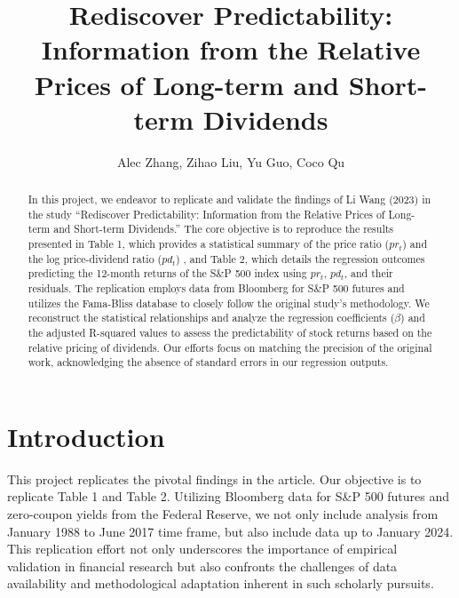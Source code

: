 \documentclass{article}
\title{Rediscover Predictability: Information from the Relative Prices of Long-term and Short-term Dividends}
\author{Alec Zhang, Zihao Liu, Yu Guo, Coco Qu}
\begin{document}
\maketitle

\begin{abstract}\noindent
In this project, we endeavor to replicate and validate the 
findings of Li Wang (2023) in the study ``Rediscover Predictability: 
Information from the Relative Prices of Long-term and Short-term 
Dividends.'' The core objective is to reproduce the results 
presented in Table 1, which provides a statistical summary of the 
price ratio (\( pr_t \)) and the log price-dividend ratio (\( pd_t \))
, and Table 2, which details the regression outcomes predicting the 
12-month returns of the S\&P 500 index using \( pr_t \), \( pd_t \), 
and their residuals.
\newline
\newline
The replication employs data from Bloomberg for S\&P 500 futures and 
utilizes the Fama-Bliss database to closely follow the original study's 
methodology. We reconstruct the statistical relationships and analyze 
the regression coefficients (\( \beta \)) and the adjusted R-squared 
values to assess the predictability of stock returns based on the 
relative pricing of dividends. Our efforts focus on matching the 
precision of the original work, acknowledging the absence of standard
 errors in our regression outputs.
\end{abstract}

\section{Introduction}
This project replicates the pivotal findings in the article. Our 
objective is to replicate Table 1 and Table 2. Utilizing Bloomberg 
data for S\&P 500 futures and zero-coupon yields from the Federal 
Reserve, we not only include analysis from January 1988 to June 
2017 time frame, but also include data up to January 2024. This 
replication effort not only underscores the importance of empirical 
validation in financial research but also confronts the challenges 
of data availability and methodological adaptation inherent in such 
scholarly pursuits.
\end{document}
